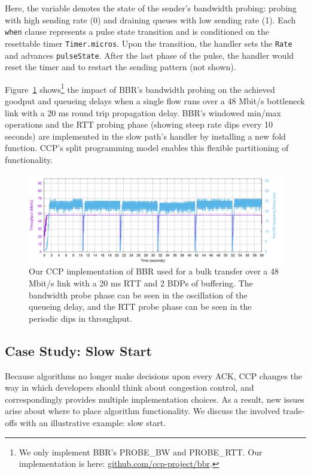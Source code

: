 Here, the variable  denotes the state of the sender's
bandwidth probing: probing with high sending rate (0) and draining queues with low
sending rate (1).
Each \texttt{when} clause represents a pulse state transition and is conditioned on the
resettable timer \texttt{Timer.micros}.
Upon the transition, the handler sets the \texttt{Rate} and advances \texttt{pulseState}.
After the last phase of the pulse, the handler would reset the timer and  to restart the sending pattern (not shown).

Figure~\ref{fig:ccp:bbr} shows\footnote{We only implement BBR's PROBE\_BW and PROBE\_RTT. Our implementation is here: \url{github.com/ccp-project/bbr}.}
the impact of BBR's bandwidth probing on the
achieved goodput and queueing delays when a single flow runs over a 48 Mbit/s
bottleneck link with a 20 ms round trip propagation delay.
%
BBR's windowed min/max operations and the RTT probing phase (showing steep rate
dips every 10 seconds) are implemented in the slow path's 
handler by installing a new fold function.
%
CCP's split programming model enables this flexible partitioning of functionality.

\begin{figure}[t]
\centering
    \includegraphics[width=\columnwidth]{img/bbr}
    \caption{
    Our CCP implementation of BBR used for a bulk transfer over a 48 Mbit/s link with a 20 ms RTT and 2 BDPs of buffering. The bandwidth probe phase can be seen in the oscillation of the queueing delay, and the RTT probe phase can be seen in the periodic dips in throughput.
    }\label{fig:ccp:bbr}
\end{figure}

\subsection{Case Study: Slow Start}
\label{s:ccp:ss}

Because algorithms no longer make decisions upon every ACK, CCP changes the way in which developers should think about congestion control, and correspondingly provides multiple implementation choices. As a result, new issues arise about where to place algorithm functionality. We discuss the involved trade-offs with an illustrative example: slow start.


